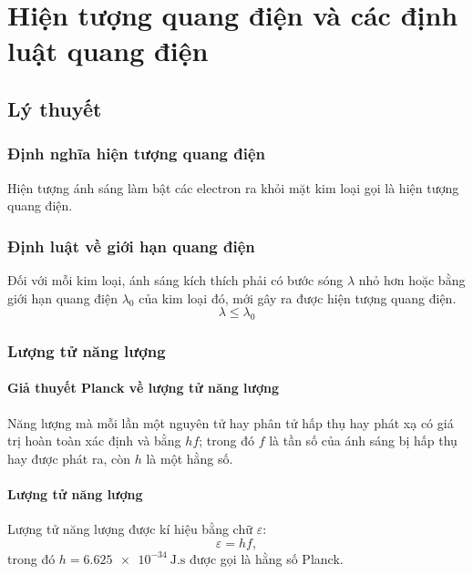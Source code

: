 
\chapter[Hiện tượng quang điện và các định luật quang điện]{Hiện tượng quang điện và các định luật quang điện}
\section{Lý thuyết}
\subsection{Định nghĩa hiện tượng quang điện}
Hiện tượng ánh sáng làm bật các electron ra khỏi mặt kim loại gọi là hiện tượng quang điện.
\subsection{Định luật về giới hạn quang điện}
Đối với mỗi kim loại, ánh sáng kích thích phải có bước sóng $\lambda$ nhỏ hơn hoặc bằng giới hạn quang điện $\lambda_0$ của kim loại đó, mới gây ra được hiện tượng quang điện.
\begin{equation}
	\lambda \leq \lambda_0
\end{equation}
\subsection{Lượng tử năng lượng}
\subsubsection{Giả thuyết Planck về lượng tử năng lượng}
Năng lượng mà mỗi lần một nguyên tử hay phân tử hấp thụ hay phát xạ có giá trị hoàn toàn xác định và bằng $hf$; trong đó $f$ là tần số của ánh sáng bị hấp thụ hay được phát ra, còn $h$ là một hằng số.
\subsubsection{Lượng tử năng lượng}
Lượng tử năng lượng được kí hiệu bằng chữ $\varepsilon$:
\begin{equation}
	\varepsilon=hf,
\end{equation}
trong đó $h=\SI{6.625e-34}{\joule . \second}$ được gọi là hằng số Planck.


